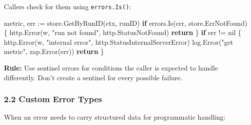 \documentclass[
]{article}
\newenvironment{Shaded}{}{}
\newcommand{\ControlFlowTok}[1]{\textcolor[rgb]{0.00,0.44,0.13}{\textbf{#1}}}
\newcommand{\NormalTok}[1]{#1}
\newcommand{\OperatorTok}[1]{\textcolor[rgb]{0.40,0.40,0.40}{#1}}
\newcommand{\OtherTok}[1]{\textcolor[rgb]{0.00,0.44,0.13}{#1}}
\newcommand{\StringTok}[1]{\textcolor[rgb]{0.25,0.44,0.63}{#1}}
\begin{document}
Callers check for them using \texttt{errors.Is()}:

\begin{Shaded}
\begin{Highlighting}[]
\NormalTok{metric}\OperatorTok{,}\NormalTok{ err }\OperatorTok{:=}\NormalTok{ store}\OperatorTok{.}\NormalTok{GetByRunID}\OperatorTok{(}\NormalTok{ctx}\OperatorTok{,}\NormalTok{ runID}\OperatorTok{)}
\ControlFlowTok{if}\NormalTok{ errors}\OperatorTok{.}\NormalTok{Is}\OperatorTok{(}\NormalTok{err}\OperatorTok{,}\NormalTok{ store}\OperatorTok{.}\NormalTok{ErrNotFound}\OperatorTok{)} \OperatorTok{\{}
\NormalTok{    http}\OperatorTok{.}\NormalTok{Error}\OperatorTok{(}\NormalTok{w}\OperatorTok{,} \StringTok{"run not found"}\OperatorTok{,}\NormalTok{ http}\OperatorTok{.}\NormalTok{StatusNotFound}\OperatorTok{)}
    \ControlFlowTok{return}
\OperatorTok{\}}
\ControlFlowTok{if}\NormalTok{ err }\OperatorTok{!=} \OtherTok{nil} \OperatorTok{\{}
\NormalTok{    http}\OperatorTok{.}\NormalTok{Error}\OperatorTok{(}\NormalTok{w}\OperatorTok{,} \StringTok{"internal error"}\OperatorTok{,}\NormalTok{ http}\OperatorTok{.}\NormalTok{StatusInternalServerError}\OperatorTok{)}
\NormalTok{    log}\OperatorTok{.}\NormalTok{Error}\OperatorTok{(}\StringTok{"get metric"}\OperatorTok{,}\NormalTok{ zap}\OperatorTok{.}\NormalTok{Error}\OperatorTok{(}\NormalTok{err}\OperatorTok{))}
    \ControlFlowTok{return}
\OperatorTok{\}}
\end{Highlighting}
\end{Shaded}

\textbf{Rule:} Use sentinel errors for conditions the caller is expected
to handle differently. Don't create a sentinel for every possible
failure.

\hypertarget{custom-error-types}{%
\subsubsection{2.2 Custom Error Types}\label{custom-error-types}}

When an error needs to carry structured data for programmatic handling:
\end{document}
